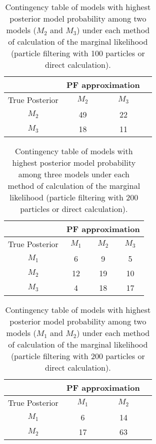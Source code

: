 \documentclass{article}
\begin{document}
\begin{table}
\begin{center}
\caption{Contingency table of models with highest posterior model probability among two models ($M_2$ and $M_3$) under each method of calculation of the marginal likelihood (particle filtering with 100 particles or direct calculation).} \label{tab:23mod100}
\begin{tabular}{|c|c|c|c|}
\hline
 & \multicolumn{2}{|c|}{PF approximation} \\
 \hline
 True Posterior & $M_2$& $M_3$  \\
 \hline
 $M_2$ & 49 & 22  \\
 $M_3$ & 18 & 11 \\
 \hline
\end{tabular}
\end{center}
\end{table}

\begin{table}
\begin{center}
\caption{Contingency table of models with highest posterior model probability among three models under each method of calculation of the marginal likelihood (particle filtering with 200 particles or direct calculation).} \label{tab:3mod200}
\begin{tabular}{|c|c|c|c|}
\hline
 & \multicolumn{3}{|c|}{PF approximation} \\
 \hline
 True Posterior & $M_1$& $M_2$ & $M_3$ \\
 \hline
 $M_1$ & 6 & 9 & 5 \\
 \hline
 $M_2$ & 12 & 19 & 10 \\
 \hline
 $M_3$ & 4 & 18 & 17 \\
 \hline
\end{tabular}
\end{center}
\end{table}

\begin{table}
\begin{center}
\caption{Contingency table of models with highest posterior model probability among two models ($M_1$ and $M_2$) under each method of calculation of the marginal likelihood (particle filtering with 200 particles or direct calculation).} \label{tab:12mod200}
\begin{tabular}{|c|c|c|c|}
\hline
 & \multicolumn{2}{|c|}{PF approximation} \\
 \hline
 True Posterior & $M_1$& $M_2$  \\
 \hline
 $M_1$ & 6 & 14  \\
 \hline
 $M_2$ & 17 & 63 \\
 \hline
\end{tabular}
\end{center}
\end{table}
\end{document}
